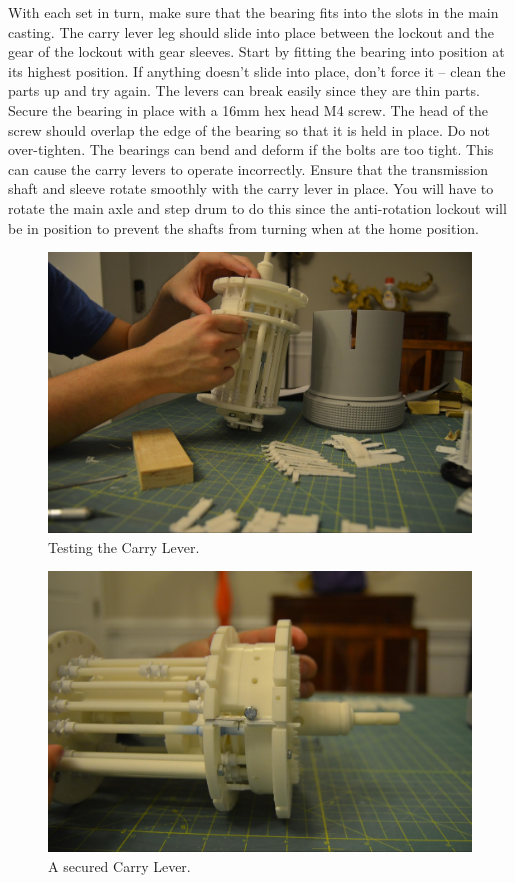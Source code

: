 \documentclass[openany]{book}
\begin{document}
With each set in turn, make sure that the bearing fits into the slots in the main casting. The carry lever leg should slide into place between the lockout and the gear of the lockout with gear sleeves. Start by fitting the bearing into position at its highest position. If anything doesn’t slide into place, don’t force it -- clean the parts up and try again. The levers can break easily since they are thin parts. Secure the bearing in place with a 16mm hex head M4 screw. The head of the screw should overlap the edge of the bearing so that it is held in place. Do not over-tighten. The bearings can bend and deform if the bolts are too tight. This can cause the carry levers to operate incorrectly. Ensure that the transmission shaft and sleeve rotate smoothly with the carry lever in place. You will have to rotate the main axle and step drum to do this since the anti-rotation lockout will be in position to prevent the shafts from turning when at the home position.

\begin{figure}[!ht]
	\centering
	\includegraphics[width=.75\textwidth]{images/image52.jpg}
	\caption{Testing the Carry Lever.}
	\label{fig:image52}	
\end{figure}


\begin{figure}[!ht]
	\centering
	\includegraphics[width=.75\textwidth]{images/image57.jpg}
	\caption{A secured Carry Lever.}
	\label{fig:image57}	
\end{figure}
\end{document}
